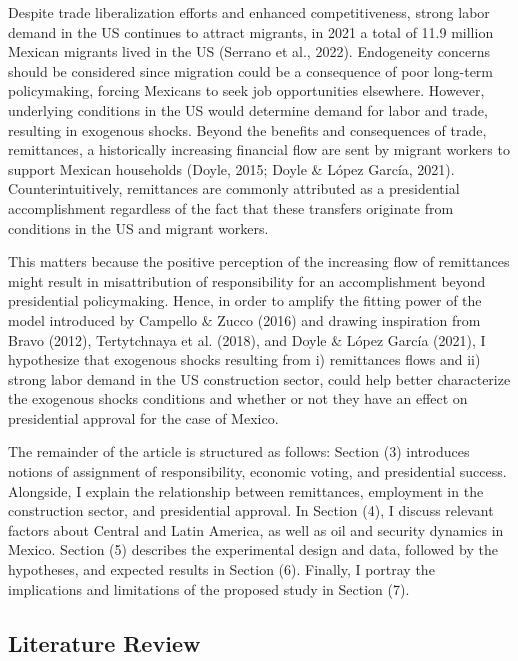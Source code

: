 \documentclass[
]{article}
\begin{document}
Despite trade liberalization efforts and enhanced competitiveness,
strong labor demand in the US continues to attract migrants, in 2021 a
total of 11.9 million Mexican migrants lived in the US (Serrano et al.,
2022). Endogeneity concerns should be considered since migration could
be a consequence of poor long-term policymaking, forcing Mexicans to
seek job opportunities elsewhere. However, underlying conditions in the
US would determine demand for labor and trade, resulting in exogenous
shocks. Beyond the benefits and consequences of trade, remittances, a
historically increasing financial flow are sent by migrant workers to
support Mexican households (Doyle, 2015; Doyle \& López García, 2021).
Counterintuitively, remittances are commonly attributed as a
presidential accomplishment regardless of the fact that these transfers
originate from conditions in the US and migrant workers.

This matters because the positive perception of the increasing flow of
remittances might result in misattribution of responsibility for an
accomplishment beyond presidential policymaking. Hence, in order to
amplify the fitting power of the model introduced by Campello \& Zucco
(2016) and drawing inspiration from Bravo (2012), Tertytchnaya et al.
(2018), and Doyle \& López García (2021), I hypothesize that exogenous
shocks resulting from i) remittances flows and ii) strong labor demand
in the US construction sector, could help better characterize the
exogenous shocks conditions and whether or not they have an effect on
presidential approval for the case of Mexico.

The remainder of the article is structured as follows: Section (3)
introduces notions of assignment of responsibility, economic voting, and
presidential success. Alongside, I explain the relationship between
remittances, employment in the construction sector, and presidential
approval. In Section (4), I discuss relevant factors about Central and
Latin America, as well as oil and security dynamics in Mexico. Section
(5) describes the experimental design and data, followed by the
hypotheses, and expected results in Section (6). Finally, I portray the
implications and limitations of the proposed study in Section (7).

\hypertarget{literature-review}{%
\subsection{Literature Review}\label{literature-review}}
\end{document}
